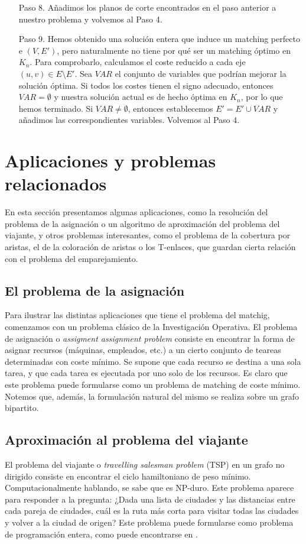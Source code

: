 \documentclass[twoside,a4paper,openright,12pt,tikz]{book}
\begin{document}
\begin{itemize}
\item[Paso 8.] Añadimos los planos de corte encontrados en el paso anterior a nuestro problema y volvemos al Paso 4.
\item[Paso 9.] Hemos obtenido una solución entera que induce un matching perfecto e $(V,E')$, pero naturalmente no tiene por qué ser un matching óptimo en $K_n$. Para comprobarlo, calculamos el coste reducido a cada eje $(u,v)\in E\setminus E'$. Sea $VAR$ el conjunto de variables que podrían mejorar la solución óptima. Si todos los costes tienen el signo adecuado, entonces $VAR=\emptyset$ y nuestra solución actual es de hecho óptima en $K_n$, por lo que hemos terminado. Si $VAR\neq \emptyset$, entonces establecemos $E'=E'\cup VAR$ y añadimos las correspondientes variables. Volvemos al Paso 4.
\end{itemize}
\section{Aplicaciones y problemas relacionados}
En esta sección presentamos algunas aplicaciones, como la resolución del problema de la asignación o un algoritmo de aproximación del problema del viajante, y otros problemas interesantes, como el problema de la cobertura por aristas, el de la coloración de aristas o los T-enlaces, que guardan cierta relación con el problema del emparejamiento.
\subsection{El problema de la asignación}
Para ilustrar las distintas aplicaciones que tiene el problema del matchig, comenzamos con un problema clásico de la Investigación Operativa. El problema de asignación o \textit{assigment assignment problem} consiste en encontrar la forma de asignar recursos (máquinas, empleados, etc.) a un cierto conjunto de teareas determinadas con coste mínimo. Se supone que cada recurso se destina a una sola tarea, y que cada tarea es ejecutada por uno solo de los recursos. Es claro que este problema puede formularse como un problema de matching de coste mínimo. Notemos que, además, la formulación natural del mismo se realiza sobre un grafo bipartito. 
\subsection{Aproximación al problema del viajante}
El problema del viajante o \textit{travelling salesman problem} (TSP) en un grafo no dirigido consiste en encontrar el ciclo hamiltoniano de peso mínimo. Computacionalmente hablando, se sabe que es NP-duro. Este problema aparece para responder a la pregunta: ¿Dada una lista de ciudades y las distancias entre cada pareja de ciudades, cuál es la ruta más corta para visitar todas las ciudades y volver a la ciudad de origen? Este problema puede formularse como problema de programación entera, como puede encontrarse en \cite{papa}. 
\end{document}
